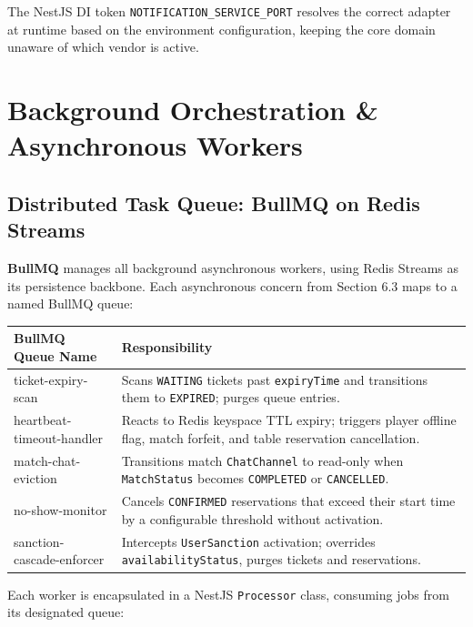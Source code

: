 \documentclass[11pt,a4paper]{report}
\begin{document}
The NestJS DI token \texttt{NOTIFICATION\_SERVICE\_PORT} resolves the correct adapter at runtime based on the environment configuration, keeping the core domain unaware of which vendor is active.

\section{Background Orchestration \& Asynchronous Workers}

\subsection{Distributed Task Queue: BullMQ on Redis Streams}

\textbf{BullMQ} manages all background asynchronous workers, using Redis Streams as its persistence backbone. Each asynchronous concern from Section 6.3 maps to a named BullMQ queue:

\begin{center}
\setlength{\tabcolsep}{5pt}
\begin{tabular}{>{\ttfamily}p{4.5cm} p{9.5cm}}
\toprule
\textbf{BullMQ Queue Name} & \textbf{Responsibility} \\
\midrule
ticket-expiry-scan & Scans \texttt{WAITING} tickets past \texttt{expiryTime} and transitions them to \texttt{EXPIRED}; purges queue entries. \\
heartbeat-timeout-handler & Reacts to Redis keyspace TTL expiry; triggers player offline flag, match forfeit, and table reservation cancellation. \\
match-chat-eviction & Transitions match \texttt{ChatChannel} to read-only when \texttt{MatchStatus} becomes \texttt{COMPLETED} or \texttt{CANCELLED}. \\
no-show-monitor & Cancels \texttt{CONFIRMED} reservations that exceed their start time by a configurable threshold without activation. \\
sanction-cascade-enforcer & Intercepts \texttt{UserSanction} activation; overrides \texttt{availabilityStatus}, purges tickets and reservations. \\
\bottomrule
\end{tabular}
\end{center}

Each worker is encapsulated in a NestJS \texttt{Processor} class, consuming jobs from its designated queue:
\end{document}
